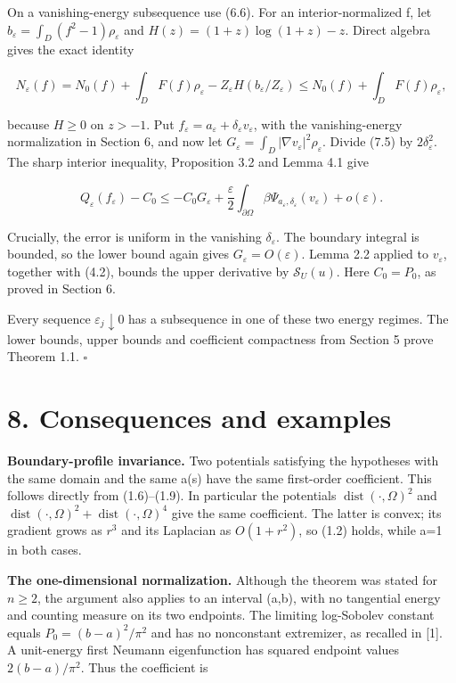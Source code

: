 \documentclass[11pt]{article}
\begin{document}
On a vanishing-energy subsequence use (6.6). For an interior-normalized
f, let \(b_\varepsilon =\int _D(f^{2}-1)\rho _\varepsilon\) and
\(H(z)=(1+z)\log (1+z)-z\). Direct algebra gives the exact identity

\[N_\varepsilon(f)=N_0(f)+\int_DF(f)\rho_\varepsilon
-Z_\varepsilon H(b_\varepsilon/Z_\varepsilon)
\leq N_0(f)+\int_DF(f)\rho_\varepsilon,\tag{7.5}\]

because \(H\geq 0\) on \(z>-1\). Put
\(f_\varepsilon =a_\varepsilon +\delta _\varepsilon v_\varepsilon\),
with the vanishing-energy normalization in Section 6, and now let
\(G_\varepsilon =\int _D|\nabla v_\varepsilon |^{2}\rho _\varepsilon\).
Divide (7.5) by \(2\delta _\varepsilon ^{2}\). The sharp interior
inequality, Proposition 3.2 and Lemma 4.1 give

\[Q_\varepsilon(f_\varepsilon)-C_0
\leq-C_0G_\varepsilon
+\frac\varepsilon2\int_{\partial\Omega}\beta\Psi_{a_\varepsilon,\delta_\varepsilon}(v_\varepsilon)
+o(\varepsilon).\tag{7.6}\]

Crucially, the error is uniform in the vanishing
\(\delta _\varepsilon\). The boundary integral is bounded, so the lower
bound again gives \(G_\varepsilon =O(\varepsilon )\). Lemma 2.2 applied
to \(v_\varepsilon\), together with (4.2), bounds the upper derivative
by \(\mathcal{S} _U(u)\). Here \(C_0=P_0\), as proved in Section 6.

Every sequence \(\varepsilon _j\downarrow 0\) has a subsequence in one
of these two energy regimes. The lower bounds, upper bounds and
coefficient compactness from Section 5 prove Theorem 1.1. \(\square\)

\section{8. Consequences and examples}\label{consequences-and-examples}

\textbf{Boundary-profile invariance.} Two potentials satisfying the
hypotheses with the same domain and the same a(s) have the same
first-order coefficient. This follows directly from (1.6)--(1.9). In
particular the potentials \(\operatorname{dist}(\cdot ,\Omega )^{2}\)
and
\(\operatorname{dist}(\cdot ,\Omega )^{2}+\operatorname{dist}(\cdot ,\Omega )^{4}\)
give the same coefficient. The latter is convex; its gradient grows as
\(r^{3}\) and its Laplacian as \(O(1+r^{2})\), so (1.2) holds, while a=1
in both cases.

\textbf{The one-dimensional normalization.} Although the theorem was
stated for \(n\geq 2\), the argument also applies to an interval (a,b),
with no tangential energy and counting measure on its two endpoints. The
limiting log-Sobolev constant equals \(P_0=(b-a)^{2}/\pi ^{2}\) and has
no nonconstant extremizer, as recalled in {[}1{]}. A unit-energy first
Neumann eigenfunction has squared endpoint values \(2(b-a)/\pi ^{2}\).
Thus the coefficient is
\end{document}

